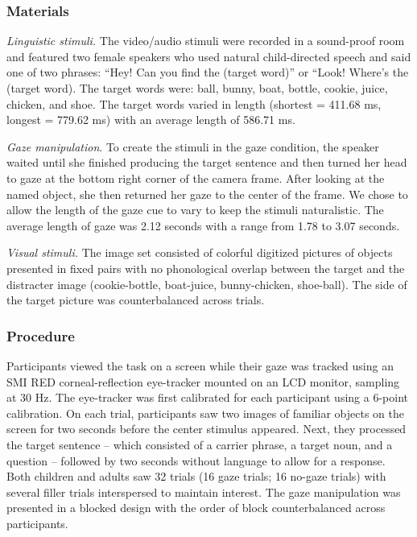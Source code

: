 \documentclass[man,floatsintext]{apa6}
\begin{document}
\subsubsection{Materials}\label{materials}

\emph{Linguistic stimuli.} The video/audio stimuli were recorded in a
sound-proof room and featured two female speakers who used natural
child-directed speech and said one of two phrases: \enquote{Hey! Can you
find the (target word)} or ``Look! Where's the (target word). The target
words were: ball, bunny, boat, bottle, cookie, juice, chicken, and shoe.
The target words varied in length (shortest = 411.68 ms, longest =
779.62 ms) with an average length of 586.71 ms.

\emph{Gaze manipulation}. To create the stimuli in the gaze condition,
the speaker waited until she finished producing the target sentence and
then turned her head to gaze at the bottom right corner of the camera
frame. After looking at the named object, she then returned her gaze to
the center of the frame. We chose to allow the length of the gaze cue to
vary to keep the stimuli naturalistic. The average length of gaze was
2.12 seconds with a range from 1.78 to 3.07 seconds.

\emph{Visual stimuli.} The image set consisted of colorful digitized
pictures of objects presented in fixed pairs with no phonological
overlap between the target and the distracter image (cookie-bottle,
boat-juice, bunny-chicken, shoe-ball). The side of the target picture
was counterbalanced across trials.

\subsubsection{Procedure}\label{procedure}

Participants viewed the task on a screen while their gaze was tracked
using an SMI RED corneal-reflection eye-tracker mounted on an LCD
monitor, sampling at 30 Hz. The eye-tracker was first calibrated for
each participant using a 6-point calibration. On each trial,
participants saw two images of familiar objects on the screen for two
seconds before the center stimulus appeared. Next, they processed the
target sentence -- which consisted of a carrier phrase, a target noun,
and a question -- followed by two seconds without language to allow for
a response. Both children and adults saw 32 trials (16 gaze trials; 16
no-gaze trials) with several filler trials interspersed to maintain
interest. The gaze manipulation was presented in a blocked design with
the order of block counterbalanced across participants.
\end{document}
